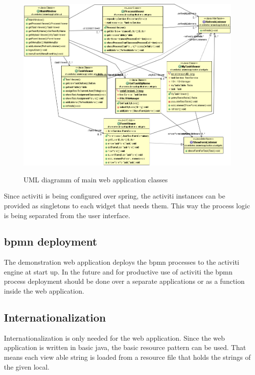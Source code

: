 \documentclass[paper=a4,twoside=false,BCOR=0mm,DIV=calc,fontsize=12pt]{scrartcl}
\begin{document}
\begin{figure}
    \begin{center}
      \includegraphics[width=1\textwidth]{./img/uml_webapp_model.png}\\
    \end{center}
  \caption{UML diagramm of main web application classes}
  \label{webapplicationclassuml}
\end{figure} 

Since activiti is being configured over spring, the activiti instances can be provided as singletons to each widget that needs them. This way the
process logic is being separated from the user interface.




\subsection{bpmn deployment}
The demonstration web application deploys the bpmn processes to the activiti engine at start up. In the future and for productive use of activiti the
bpmn process deployment should be done over a separate applications or as a function inside the web application. 


\subsection{Internationalization}
Internationalization is only needed for the web application. Since the web application is written in basic java, the basic resource pattern can be used. That means each view able string is loaded from a resource file that holds the strings of the given local. 
\end{document}
